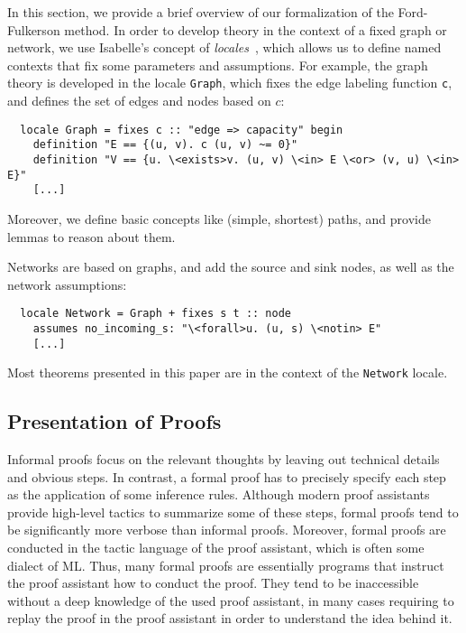 \documentclass[smallcondensed]{svjour3}     %
\newcommand{\isai}{\lstinline[language=isabelle,basicstyle=\normalsize\ttfamily\slshape]}
\begin{document}

In this section, we provide a brief overview of our formalization of the Ford-Fulkerson method. 
In order to develop theory in the context of a fixed graph or network, we use Isabelle's concept of \emph{locales}~\cite{Ballarin:2006:MKM}, which allows
us to define named contexts that fix some parameters and assumptions.
For example, the graph theory is developed in the locale \isai{Graph}, which 
fixes the edge labeling function \isai{c}, and defines the set of edges and nodes based on $c$:
\begin{lstlisting}
  locale Graph = fixes c :: "edge => capacity" begin
    definition "E == {(u, v). c (u, v) ~= 0}"
    definition "V == {u. \<exists>v. (u, v) \<in> E \<or> (v, u) \<in> E}"
    [...]
\end{lstlisting}
Moreover, we define basic concepts like (simple, shortest) paths, and provide lemmas to reason about them.

Networks are based on graphs, and add the source and sink nodes, as well as the network assumptions:
\begin{lstlisting}
  locale Network = Graph + fixes s t :: node
    assumes no_incoming_s: "\<forall>u. (u, s) \<notin> E"
    [...]
\end{lstlisting}
Most theorems presented in this paper are in the context of the \isai{Network} locale.

\subsection{Presentation of Proofs}
Informal proofs focus on the relevant thoughts by leaving out technical details and obvious steps. 
In contrast, a formal proof has to precisely specify each step as the application of some inference rules. 
Although modern proof assistants provide high-level tactics to summarize some of these steps, formal proofs tend to be significantly more 
verbose than informal proofs. Moreover, formal proofs are conducted in the tactic language of the proof assistant, which is often some dialect of ML. 
Thus, many formal proofs are essentially programs that instruct the proof assistant how to conduct the proof. They tend to be inaccessible without a deep knowledge of the used proof assistant, in many cases requiring to replay the proof in the proof assistant in order to understand the idea behind it.
\end{document}

